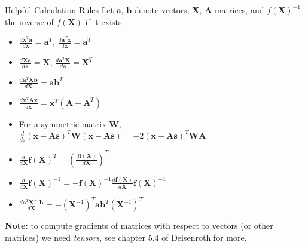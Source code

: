 \documentclass[11pt,compress,t,notes=noshow, xcolor=table]{beamer}
\begin{document}
\begin{framev}[fs=small]{Helpful Calculation Rules}
Let $\boldsymbol{a}$, $\boldsymbol{b}$ denote vectors, $\boldsymbol{X}$, $\boldsymbol{A}$ matrices, and $f(\boldsymbol{X})^{-1}$ the inverse of $f(\boldsymbol{X})$ if it exists.
\begin{itemize}
\item $ \frac{d \boldsymbol{x}^{T} \boldsymbol{a}}{d \boldsymbol{x}}=\boldsymbol{a}^{T}$, $\frac{d \boldsymbol{a}^{T} \boldsymbol{x}}{d \boldsymbol{x}}=\boldsymbol{a}^{T}$
\item $\frac{d\boldsymbol{X}\boldsymbol{a}}{d\boldsymbol{a}} = \boldsymbol{X}$, $\frac{d\boldsymbol{a}^T\boldsymbol{X}}{d\boldsymbol{a}} = \boldsymbol{X}^T$
\item $\frac{d \boldsymbol{a}^{T} \boldsymbol{X} \boldsymbol{b}}{d \boldsymbol{X}}=\boldsymbol{a} \boldsymbol{b}^{T}$
\item $\frac{d \boldsymbol{x}^{T} \boldsymbol{A} \boldsymbol{x}}{d \boldsymbol{x}}=\boldsymbol{x}^{T}\left(\boldsymbol{A}+\boldsymbol{A}^{T}\right)$
\item For a symmetric matrix $\boldsymbol{W}$, $\frac{d}{d \boldsymbol{s}}(\boldsymbol{x}-\boldsymbol{A} \boldsymbol{s})^{T} \boldsymbol{W}(\boldsymbol{x}-\boldsymbol{A} \boldsymbol{s})=-2(\boldsymbol{x}-\boldsymbol{A} \boldsymbol{s})^{T} \boldsymbol{W} \boldsymbol{A}$
\item $\frac{d}{d \boldsymbol{X}} \boldsymbol{f}(\boldsymbol{X})^{T}=\left(\frac{d \boldsymbol{f}(\boldsymbol{X})}{d \boldsymbol{X}}\right)^{T}$
\item $\frac{d}{d \boldsymbol{X}} \boldsymbol{f}(\boldsymbol{X})^{-1}=-\boldsymbol{f}(\boldsymbol{X})^{-1} \frac{d \boldsymbol{f}(\boldsymbol{X})}{d \boldsymbol{X}} \boldsymbol{f}(\boldsymbol{X})^{-1}$
\item $\frac{d \boldsymbol{a}^{T} \boldsymbol{X}^{-1} \boldsymbol{b}}{d \boldsymbol{X}}=-\left(\boldsymbol{X}^{-1}\right)^{T} \boldsymbol{a} \boldsymbol{b}^{T}\left(\boldsymbol{X}^{-1}\right)^{T}$
\end{itemize}
\spacer
\begin{small}
\textbf{Note:} to compute gradients of matrices
with respect to vectors (or other matrices) we need \emph{tensors}, see chapter 5.4 of Deisenroth for more.
\end{small}
\end{framev}
\end{document}
